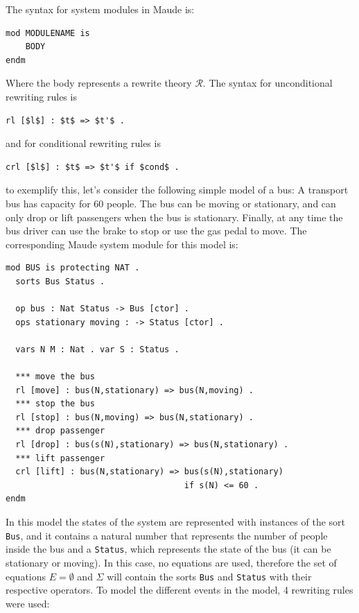 The syntax for system modules in Maude is:
\begin{lstlisting}
mod MODULENAME is
    BODY
endm
\end{lstlisting}
Where the body represents a rewrite theory $\mathscr{R}$. The syntax for unconditional rewriting rules is
\begin{lstlisting}[mathescape=true]
rl [$l$] : $t$ => $t'$ .
\end{lstlisting}
and for conditional rewriting rules is
\begin{lstlisting}[mathescape=true]
crl [$l$] : $t$ => $t'$ if $cond$ .
\end{lstlisting}
to exemplify this, let's consider the following simple model of a bus: A transport bus has capacity for 60 people. The bus can be moving or stationary, and can only drop or lift passengers when the bus is stationary. Finally, at any time the bus driver can use the brake to stop or use the gas pedal to move. The corresponding Maude system module for this model is:
\begin{lstlisting}
mod BUS is protecting NAT .
  sorts Bus Status .

  op bus : Nat Status -> Bus [ctor] .
  ops stationary moving : -> Status [ctor] .
 
  vars N M : Nat . var S : Status .

  *** move the bus
  rl [move] : bus(N,stationary) => bus(N,moving) .
  *** stop the bus 
  rl [stop] : bus(N,moving) => bus(N,stationary) .
  *** drop passenger
  rl [drop] : bus(s(N),stationary) => bus(N,stationary) .
  *** lift passenger
  crl [lift] : bus(N,stationary) => bus(s(N),stationary) 
                                    if s(N) <= 60 . 
endm
\end{lstlisting}
In this model the states of the system are represented with instances of the sort \texttt{Bus}, and it contains a natural number that represents the number of people inside the bus and a \texttt{Status}, which represents the state of the bus (it can be stationary or moving). In this case, no equations are used, therefore the set of equations $E = \emptyset$  and $\Sigma$ will contain the sorts \texttt{Bus} and \texttt{Status} with their respective operators. To model the different events in the model, 4 rewriting rules were used:
